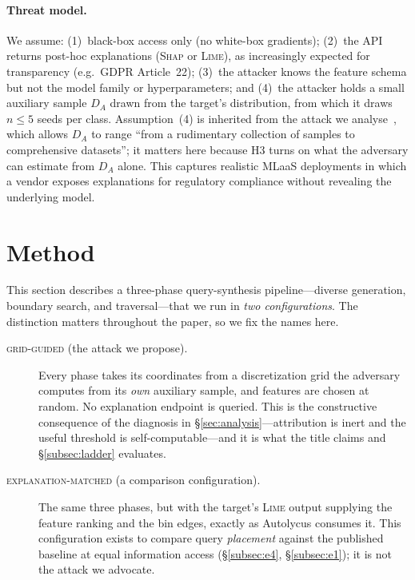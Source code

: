 \documentclass[sigconf,anonymous,review]{acmart}
\begin{document}
\paragraph{Threat model.}
We assume: (1)~black-box access only (no white-box gradients); (2)~the API returns
post-hoc explanations (\textsc{Shap} or \textsc{Lime}), as increasingly expected for
transparency (e.g.\ GDPR Article~22); (3)~the attacker knows the feature schema but
not the model family or hyperparameters; and (4)~the attacker holds a small auxiliary
sample $D_A$ drawn from the target's distribution, from which it draws $n{\le}5$ seeds per
class. Assumption~(4) is inherited from the attack we analyse~\cite{oksuz2024autolycus},
which allows $D_A$ to range ``from a rudimentary collection of samples to comprehensive
datasets''; it matters here because H3 turns on what the adversary can estimate from $D_A$
alone. This captures realistic MLaaS deployments in which a vendor exposes explanations for
regulatory compliance without revealing the underlying model.

\section{Method}
\label{sec:method}
This section describes a three-phase query-synthesis pipeline---diverse generation, boundary search,
and traversal---that we run in \emph{two configurations}. The distinction matters throughout the
paper, so we fix the names here.

\begin{description}
  \item[\textsc{grid-guided} (the attack we propose).] Every phase takes its coordinates from a
  discretization grid the adversary computes from its \emph{own} auxiliary sample, and features are
  chosen at random. No explanation endpoint is queried. This is the constructive consequence of the
  diagnosis in \S\ref{sec:analysis}---attribution is inert and the useful threshold is
  self-computable---and it is what the title claims and \S\ref{subsec:ladder} evaluates.
  \item[\textsc{explanation-matched} (a comparison configuration).] The same three phases, but with
  the target's \textsc{Lime} output supplying the feature ranking and the bin edges, exactly as
  Autolycus consumes it. This configuration exists to compare query \emph{placement} against the
  published baseline at equal information access (\S\ref{subsec:e4}, \S\ref{subsec:e1}); it is not the
  attack we advocate.
\end{description}
\end{document}
